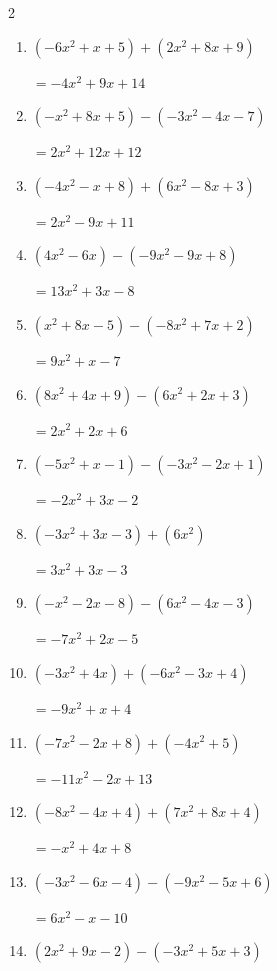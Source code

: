 \begin{multicols}{2}
\begin{enumerate}
  \item $(-6x^{2}+x+5)+(2x^{2}+8x+9)$

        $=-4x^{2}+9x+14$

  \item $(-x^{2}+8x+5)-(-3x^{2}-4x-7)$

        $=2x^{2}+12x+12$

  \item $(-4x^{2}-x+8)+(6x^{2}-8x+3)$

        $=2x^{2}-9x+11$

  \item $(4x^{2}-6x)-(-9x^{2}-9x+8)$

        $=13x^{2}+3x-8$

  \item $(x^{2}+8x-5)-(-8x^{2}+7x+2)$

        $=9x^{2}+x-7$

  \item $(8x^{2}+4x+9)-(6x^{2}+2x+3)$

        $=2x^{2}+2x+6$

  \item $(-5x^{2}+x-1)-(-3x^{2}-2x+1)$

        $=-2x^{2}+3x-2$

  \item $(-3x^{2}+3x-3)+(6x^{2})$

        $=3x^{2}+3x-3$

  \item $(-x^{2}-2x-8)-(6x^{2}-4x-3)$

        $=-7x^{2}+2x-5$

  \item $(-3x^{2}+4x)+(-6x^{2}-3x+4)$

        $=-9x^{2}+x+4$

\columnbreak %

\resetques

  \item $(-7x^{2}-2x+8)+(-4x^{2}+5)$

        $=-11x^{2}-2x+13$

  \item $(-8x^{2}-4x+4)+(7x^{2}+8x+4)$

        $=-x^{2}+4x+8$

  \item $(-3x^{2}-6x-4)-(-9x^{2}-5x+6)$

        $=6x^{2}-x-10$

  \item $(2x^{2}+9x-2)-(-3x^{2}+5x+3)$


\end{enumerate}
\end{multicols}
